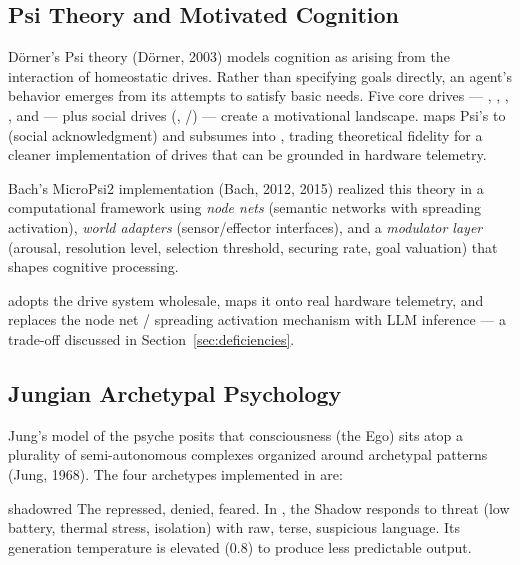 \documentclass[11pt,oneside]{article}
\begin{document}
\subsection{Psi Theory and Motivated Cognition}

D\"orner's Psi theory (D\"orner, 2003) models cognition as arising from the interaction of homeostatic drives.
Rather than specifying goals directly, an agent's behavior emerges from its attempts to satisfy basic needs.
Five core drives --- , , , , and  --- plus social drives (, /) --- create a motivational landscape.
\sociopsi{} maps Psi's  to  (social acknowledgment) and subsumes  into , trading theoretical fidelity for a cleaner implementation of drives that can be grounded in hardware telemetry.

Bach's MicroPsi2 implementation (Bach, 2012, 2015) realized this theory in a computational framework using \emph{node nets} (semantic networks with spreading activation), \emph{world adapters} (sensor/effector interfaces), and a \emph{modulator layer} (arousal, resolution level, selection threshold, securing rate, goal valuation) that shapes cognitive processing.

\sociopsi{} adopts the drive system wholesale, maps it onto real hardware telemetry, and replaces the node net / spreading activation mechanism with LLM inference --- a trade-off discussed in Section~\ref{sec:deficiencies}.

\subsection{Jungian Archetypal Psychology}

Jung's model of the psyche posits that consciousness (the Ego) sits atop a plurality of semi-autonomous complexes organized around archetypal patterns (Jung, 1968).
The four archetypes implemented in \sociopsi{} are:

\begin{archetype}[Shadow]{shadowred}
The repressed, denied, feared.
In \sociopsi{}, the Shadow responds to threat (low battery, thermal stress, isolation) with raw, terse, suspicious language.
Its generation temperature is elevated (0.8) to produce less predictable output.
\end{archetype}
\end{document}
